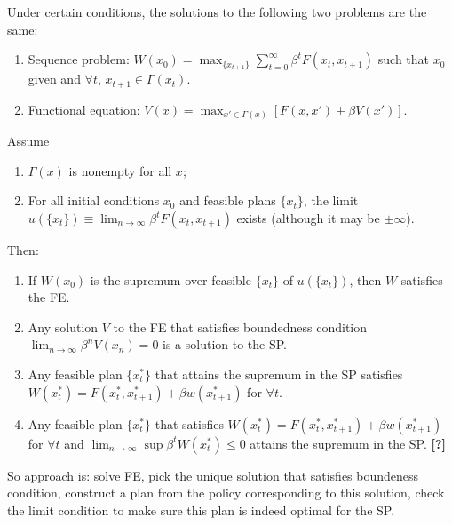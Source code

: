 \documentclass[8pt,letterpaper, landscape]{extarticle} %
\begin{document}
\begin{multicols}{3}
\begin{description}
 Under certain conditions, the solutions to the following two problems are the same:
\begin{enumerate}
\item Sequence problem: $ W(x_0) = \max_{ \{ x_{t+1} \} } \sum_{t=0}^{\infty} \beta^t F(x_t, x_{t+1}) $ such that $ x_0 $ given and $ \forall t $, $ x_{t+1} \in \Gamma (x_t) $.
\item Functional equation: $ V(x) = \max_{x' \in \Gamma (x)} [F(x,x') + \beta V(x')] $.
\end{enumerate}
Assume
\begin{enumerate}
\item \label{assump1} $ \Gamma (x) $ is nonempty for all $ x $;
\item \label{assump2} For all initial conditions $ x_0 $ and feasible plans $ \{ x_t \} $, the limit $ u(\{ x_t \}) \equiv  \lim_{n \to \infty} \beta^t F(x_t, x_{t+1}) $ exists (although it may be $ \pm \infty $).
\end{enumerate}
Then:
\begin{enumerate}
\item If $ W(x_0) $ is the supremum over feasible $ \{ x_t \} $ of $ u( \{ x_t \} ) $, then $ W $ satisfies the FE.
\item Any solution $ V $ to the FE that satisfies boundedness condition $ \lim_{n \to \infty} \beta^n V(x_n) = 0 $ is a solution to the SP.
\item Any feasible plan $ \{ x_t^* \} $ that attains the supremum in the SP satisfies $ W(x_t^*) = F(x_t^*, x_{t+1}^*) + \beta w(x_{t+1}^*) $ for $ \forall t $.
\item Any feasible plan $ \{ x_t^* \} $ that satisfies $ W(x_t^*) = F(x_t^*, x_{t+1}^*) + \beta w(x_{t+1}^*) $ for $ \forall t $ and $ \lim_{n \to \infty} \sup \beta^t W(x_t^*) \leq 0 $ attains the supremum in the SP. \textbf{[?]}
\end{enumerate}
So approach is: solve FE, pick the unique solution that satisfies boundeness condition, construct a plan from the policy corresponding to this solution, check the limit condition to make sure this plan is indeed optimal for the SP.


\end{description}
\end{multicols}
\end{document}
